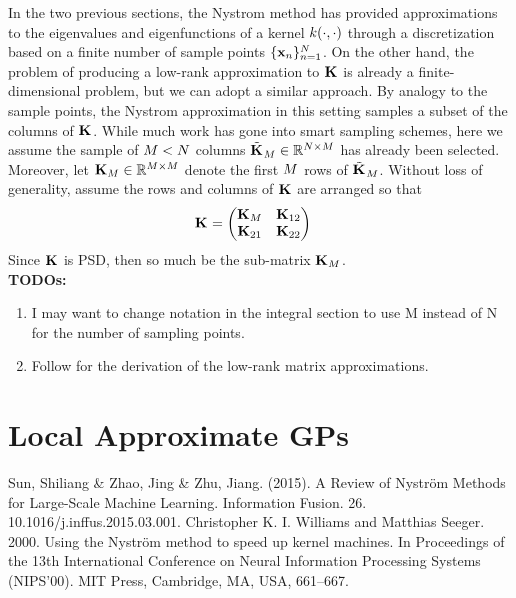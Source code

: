 \documentclass[12pt]{article}
\begin{document}
In the two previous sections, the Nystrom method has provided approximations to the eigenvalues and eigenfunctions of a kernel $\GPKer(\cdot, \cdot)$ through a discretization 
based on a finite number of sample points $\{\bx_{\designIdx}\}_{\designIdx = 1}^{\Ndesign}$. On the other hand, the problem of producing a low-rank approximation to $\kerMat$ is already 
a finite-dimensional problem, but we can adopt a similar approach. By analogy to the sample points, the Nystrom approximation in this setting samples a subset of the columns of $\kerMat$. 
While much work has gone into smart sampling schemes, here we assume the sample of $\NpseudoData < \Ndesign$ columns $\tilde{\kerMat}_{\NpseudoData} \in \R^{\Ndesign \times \NpseudoData}$ has already been 
selected. Moreover, let $\kerMat[\NpseudoData] \in \R^{\NpseudoData \times \NpseudoData}$ denote the first $\NpseudoData$ rows of $\tilde{\kerMat}_{\NpseudoData}$. Without loss of generality, assume the 
rows and columns of $\kerMat$ are arranged so that 
\begin{align}
\kerMat &= \begin{pmatrix} \kerMat[\NpseudoData] & \kerMat[12] \\ \kerMat[21] & \kerMat[22] \end{pmatrix}
\end{align}
Since $\kerMat$ is PSD, then so much be the sub-matrix $\kerMat[\NpseudoData]$. \\

\bigskip
\textbf{TODOs:}
\begin{enumerate}
\item I may want to change notation in the integral section to use M instead of N for the number of sampling points. 
\item Follow \cite{Williams} for the derivation of the low-rank matrix approximations. 
\end{enumerate}


\section{Local Approximate GPs}

\begin{thebibliography}{20}
 Sun, Shiliang \& Zhao, Jing \& Zhu, Jiang. (2015). A Review of Nyström Methods for Large-Scale Machine Learning. Information Fusion. 26. 10.1016/j.inffus.2015.03.001. 
 Christopher K. I. Williams and Matthias Seeger. 2000. Using the Nyström method to speed up kernel machines. In Proceedings of the 13th International Conference on Neural Information Processing Systems (NIPS'00). MIT Press, Cambridge, MA, USA, 661–667.
\end{thebibliography}
\end{document}
